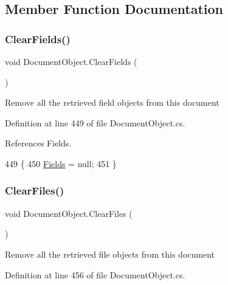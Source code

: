 \subsection{Member Function Documentation}
\mbox{\label{class_document_object_a28ab6562c34b5cf44ce7ab738d1730e1}} 
\subsubsection{\texorpdfstring{Clear\+Fields()}{ClearFields()}}
{\footnotesize\ttfamily void Document\+Object.\+Clear\+Fields (\begin{DoxyParamCaption}{ }\end{DoxyParamCaption})}



Remove all the retrieved field objects from this document 



Definition at line 449 of file Document\+Object.\+cs.



References Fields.


\begin{DoxyCode}
449                               \{
450         \mbox{\hyperlink{class_document_object_ae203b8a3e40b6c428145d2335b71245c}{Fields}} = null;
451     \}
\end{DoxyCode}
\mbox{\label{class_document_object_a4caebae7aec2a9375112739d2cf29f29}} 
\subsubsection{\texorpdfstring{Clear\+Files()}{ClearFiles()}}
{\footnotesize\ttfamily void Document\+Object.\+Clear\+Files (\begin{DoxyParamCaption}{ }\end{DoxyParamCaption})}



Remove all the retrieved file objects from this document 



Definition at line 456 of file Document\+Object.\+cs.



